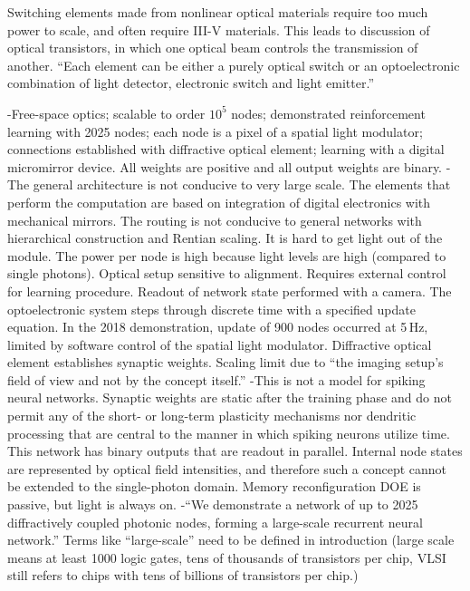 \vspace{3em}
Switching elements made from nonlinear optical materials require too much power to scale, and often require III-V materials. This leads to discussion of optical transistors, in which one optical beam controls the transmission of another. ``Each element can be either a purely optical switch or an optoelectronic combination of light detector, electronic switch and light emitter.'' \cite{abps1987}


\cite{buma2018}
-Free-space optics; scalable to order $10^5$ nodes; demonstrated reinforcement learning with 2025 nodes; each node is a pixel of a spatial light modulator; connections established with diffractive optical element; learning with a digital micromirror device. All weights are positive and all output weights are binary.
-The general architecture is not conducive to very large scale. The elements that perform the computation are based on integration of digital electronics with mechanical mirrors. The routing is not conducive to general networks with hierarchical construction and Rentian scaling. It is hard to get light out of the module. The power per node is high because light levels are high (compared to single photons). Optical setup sensitive to alignment. Requires external control for learning procedure. Readout of network state performed with a camera. The optoelectronic system steps through discrete time with a specified update equation. In the 2018 demonstration, update of 900 nodes occurred at 5\,Hz, limited by software control of the spatial light modulator. Diffractive optical element establishes synaptic weights. Scaling limit due to ``the imaging setup's field of view and not by the concept itself.''
-This is not a model for spiking neural networks. Synaptic weights are static after the training phase and do not permit any of the short- or long-term plasticity mechanisms nor dendritic processing that are central to the manner in which spiking neurons utilize time. This network has binary outputs that are readout in parallel. Internal node states are represented by optical field intensities, and therefore such a concept cannot be extended to the single-photon domain. Memory reconfiguration DOE is passive, but light is always on.
-``We demonstrate a network of up to 2025 diffractively coupled photonic nodes, forming a large-scale recurrent neural network.'' Terms like ``large-scale'' need to be defined in introduction (large scale means at least 1000 logic gates, tens of thousands of transistors per chip, VLSI still refers to chips with tens of billions of transistors per chip.)

